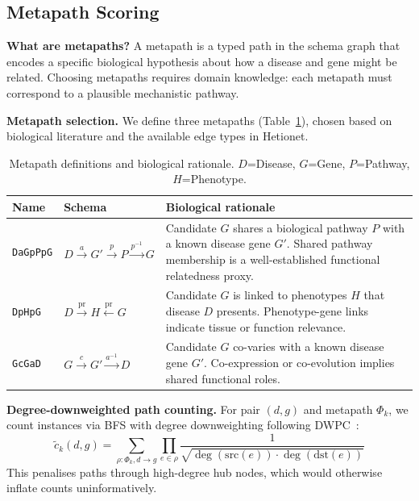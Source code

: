 \documentclass[10pt,a4paper,twocolumn]{article}
\begin{document}
\subsection{Metapath Scoring}

\textbf{What are metapaths?} A metapath is a typed path in the schema graph
that encodes a specific biological hypothesis about how a disease and gene
might be related. Choosing metapaths requires domain knowledge: each metapath
must correspond to a plausible mechanistic pathway.

\textbf{Metapath selection.} We define three metapaths (Table~\ref{tab:mp}),
chosen based on biological literature and the available edge types in Hetionet.

\begin{table}[H]
\centering\scriptsize
\caption{Metapath definitions and biological rationale. $D$=Disease, $G$=Gene,
$P$=Pathway, $H$=Phenotype.}
\label{tab:mp}
\setlength{\tabcolsep}{3pt}
\begin{tabular}{p{1.3cm}lp{3.2cm}}
\toprule
\textbf{Name} & \textbf{Schema} & \textbf{Biological rationale} \\
\midrule
\texttt{DaGpPpG} &
$D\!\xrightarrow{a}\!G'\!\xrightarrow{p}\!P\!\xrightarrow{p^{-1}}\!G$ &
Candidate $G$ shares a biological pathway $P$ with a known disease gene $G'$.
Shared pathway membership is a well-established functional relatedness proxy. \\[3pt]
\texttt{DpHpG} &
$D\!\xrightarrow{\text{pr}}\!H\!\xleftarrow{\text{pr}}\!G$ &
Candidate $G$ is linked to phenotypes $H$ that disease $D$ presents.
Phenotype-gene links indicate tissue or function relevance. \\[3pt]
\texttt{GcGaD} &
$G\!\xrightarrow{c}\!G'\!\xrightarrow{a^{-1}}\!D$ &
Candidate $G$ co-varies with a known disease gene $G'$. Co-expression or
co-evolution implies shared functional roles. \\
\bottomrule
\end{tabular}
\end{table}

\textbf{Degree-downweighted path counting.} For pair $(d,g)$ and metapath
$\Phi_k$, we count instances via BFS with degree downweighting following
DWPC~\citep{himmelstein2017}:
\begin{equation}
\tilde{c}_k(d,g) = \sum_{\rho:\Phi_k,d\to g}
\prod_{e\in\rho} \frac{1}{\sqrt{\deg(\text{src}(e))\cdot\deg(\text{dst}(e))}}
\end{equation}
This penalises paths through high-degree hub nodes, which would otherwise
inflate counts uninformatively.
\end{document}
